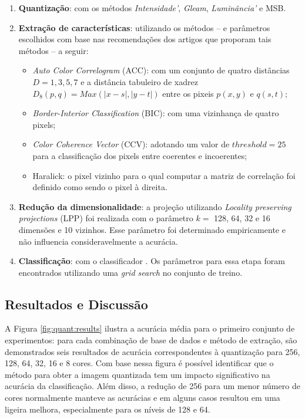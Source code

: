 \begin{enumerate}
\item \textbf{Quantização}: com os métodos \emph{Intensidade'}, \emph{Gleam}, \emph{Luminância'} e MSB.
\item \textbf{Extração de características}: utilizando os métodos -- e parâmetros escolhidos com base nas recomendações dos artigos que proporam tais métodos -- a seguir:
  \begin{itemize}
    \item \textit{Auto Color Correlogram} (ACC): com um conjunto de quatro distâncias $D = {1, 3, 5, 7}$ e a distância tabuleiro de xadrez $D_8(p,q) = Max(|x-s|, |y-t|)$ entre os pixeis $p(x,y)$ e $q(s,t)$;
    \item \textit{Border-Interior Classification} (BIC): com uma vizinhança de quatro pixels;
    \item \textit{Color Coherence Vector} (CCV): adotando um valor de $\mathit{threshold} = 25$ para a classificação dos pixels entre coerentes e incoerentes;
    \item Haralick: o pixel vizinho para o qual computar a matriz de correlação foi definido como sendo o pixel à direita.
  \end{itemize}
\item \textbf{Redução da dimensionalidade}: a projeção utilizando \textit{Locality preserving projections} (LPP) foi realizada com o parâmetro $k =$ 128, 64, 32 e 16 dimensões e 10 vizinhos. Esse parâmetro foi determinado empiricamente e não influencia consideravelmente a acurácia.
\item \textbf{Classificação}: com o classificador . Os parâmetros para essa etapa foram encontrados utilizando uma \textit{grid search} no conjunto de treino.
\end{enumerate}

\subsection{Resultados e Discussão}

A Figura \ref{fig:quant:results} ilustra a acurácia média para o primeiro conjunto de experimentos: para cada combinação de base de dados e método de extração, são demonstrados seis resultados de acurácia correspondentes à quantização para 256, 128, 64, 32, 16 e 8 cores. Com base nessa figura é possível identificar que o método para obter a imagem quantizada tem um impacto significativo na acurácia da classificação. Além disso, a redução de 256 para um menor número de cores normalmente manteve as acurácias e em alguns casos resultou em uma ligeira melhora, especialmente para os níveis de 128 e 64.

